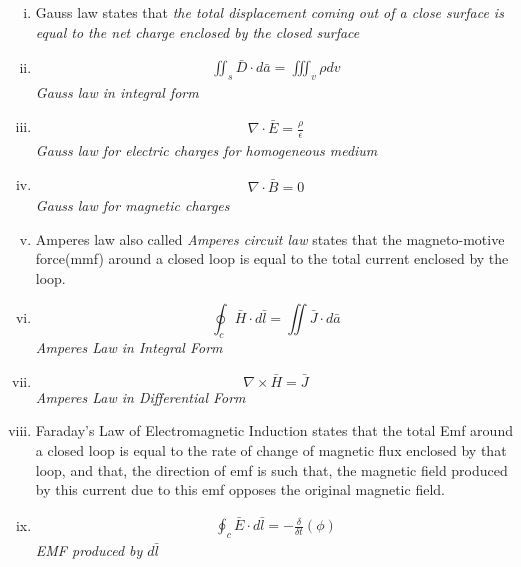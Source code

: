 \begin{mdframed}[backgroundcolor=lightblue, linewidth=1pt, hidealllines=true]
\begin{enumerate}[(i)]
	\item Gauss law states that \emph{the total displacement coming out of a close surface is equal to the net charge enclosed by the closed surface}
	
	\item \begin{align*}
		\iint_s\bar{D}\cdot{d\bar{a}} = \iiint_v\rho dv
	\end{align*}
	\emph{Gauss law in integral form}
	
	\item \begin{align*} 
		\nabla \cdot \bar{E} = \frac{\rho}{\epsilon}
	\end{align*} 
	\emph{Gauss law for electric charges for homogeneous medium}
	
	\item \begin{align*}
		\nabla \cdot \bar{B} = 0
	\end{align*}
	\emph{Gauss law for magnetic charges}
	
	\item Amperes law also called \emph{Amperes circuit law} states that the magneto-motive force(mmf) around a closed loop is equal to the total current enclosed by the loop.
	
	\item \begin{equation*}
		\oint_c\bar{H} \cdot d\bar{l} = \iint\bar{J} \cdot d\bar{a}
	\end{equation*}
	\emph{Amperes Law in Integral Form}
	
	\item \begin{equation*}
		\boxed{\nabla \times \bar{H} = \bar{J}}
	\end{equation*}
	\emph{Amperes Law in Differential Form}
	
	\item Faraday's Law of Electromagnetic Induction states that the total Emf around a closed loop is equal to the rate of change of magnetic flux enclosed by that loop, and that, the direction of emf is such that, the magnetic field produced by this current due to this emf opposes the original magnetic field. 
	
	\item \begin{align*}
		\oint_c\bar{E} \cdot d\bar{l} = -\frac{\delta}{\delta t}(\phi)
	\end{align*}
	\emph{EMF produced by $d\bar{l}$}
	

\end{enumerate}
\end{mdframed}
